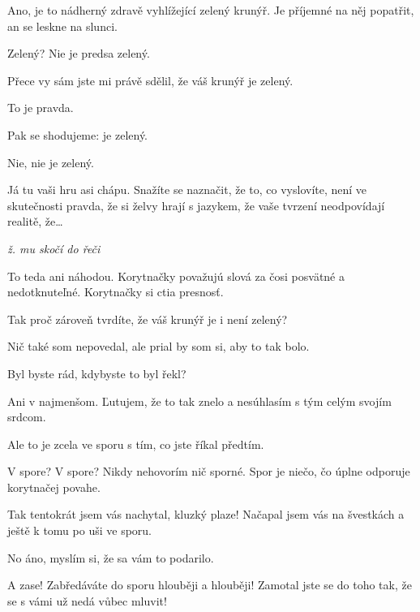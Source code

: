 \documentclass[12pt]{article}
\begin{document}
\begin{description}[itemsep=0pt]
\item[A:] Ano, je to nádherný zdravě vyhlížející zelený krunýř. Je příjemné
    na něj popatřit, an se leskne na slunci.

\item[Ž:] Zelený? Nie je predsa zelený.

\item[A:] Přece vy sám jste mi právě sdělil, že váš krunýř je zelený.

\item[Ž:] To je pravda.

\item[A:] Pak se shodujeme: je zelený.

\item[Ž:] Nie, nie je zelený.

\item[A:] Já tu vaši hru asi chápu. Snažíte se naznačit, že to, co vyslovíte,
    není ve skutečnosti pravda, že si želvy hrají s jazykem, že vaše tvrzení neodpovídají
    realitě, že…

\textit{ž. mu skočí do řeči}
\item[Ž:] To teda ani náhodou. Korytnačky považujú slová za čosi posvätné a nedotknuteľné. 
    Korytnačky si ctia presnosť.

\item[A::] Tak proč zároveň tvrdíte, že váš krunýř je i není zelený?

\item[Ž:] Nič také som nepovedal, ale prial by som si, aby to tak bolo.

\item[A:] Byl byste rád, kdybyste to byl řekl?

\item[Ž:] Ani v najmenšom. Ľutujem, že to tak znelo a nesúhlasím s tým celým svojím srdcom.

\item[A:] Ale to je zcela ve sporu s tím, co jste říkal předtím.

\item[Ž:] V spore? V spore? Nikdy nehovorím nič sporné. Spor je niečo, čo úplne odporuje 
    korytnačej povahe.

\item[A:] Tak tentokrát jsem vás nachytal, kluzký plaze! Načapal jsem vás na švestkách
    a ještě k tomu po uši ve sporu.

\item[Ž:] No áno, myslím si, že sa vám to podarilo.

\item[A:] A zase! Zabředáváte do sporu hlouběji a hlouběji! Zamotal jste  se do toho
    tak, že se s vámi už nedá vůbec mluvit!


\end{description}
\end{document}

